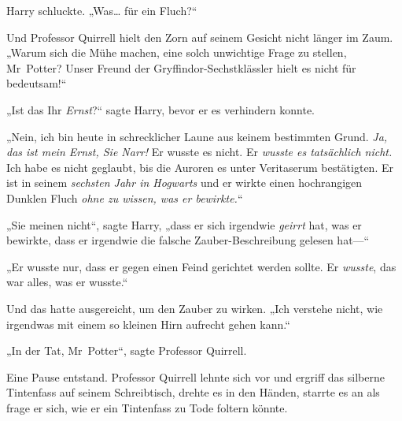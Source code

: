 Harry schluckte. „Was… für ein Fluch?“

Und Professor Quirrell hielt den Zorn auf seinem Gesicht nicht länger im Zaum. „Warum sich die Mühe machen, eine solch unwichtige Frage zu stellen, Mr~Potter? Unser Freund der Gryffindor-Sechstklässler hielt es nicht für bedeutsam!“

„Ist das Ihr \emph{Ernst}?“ sagte Harry, bevor er es verhindern konnte.

„Nein, ich bin heute in schrecklicher Laune aus keinem bestimmten Grund. \emph{Ja, das ist mein Ernst, Sie Narr!} Er wusste es nicht. Er \emph{wusste es tatsächlich nicht.} Ich habe es nicht geglaubt, bis die Auroren es unter Veritaserum bestätigten. Er ist in seinem \emph{sechsten Jahr in Hogwarts} und er wirkte einen hochrangigen Dunklen Fluch \emph{ohne zu wissen, was er bewirkte.}“

„Sie meinen nicht“, sagte Harry, „dass er sich irgendwie \emph{geirrt} hat, was er bewirkte, dass er irgendwie die falsche Zauber-Beschreibung gelesen hat—“

„Er wusste nur, dass er gegen einen Feind gerichtet werden sollte. Er \emph{wusste}, das war alles, was er wusste.“

Und das hatte ausgereicht, um den Zauber zu wirken. „Ich verstehe nicht, wie irgendwas mit einem so kleinen Hirn aufrecht gehen kann.“

„In der Tat, Mr~Potter“, sagte Professor Quirrell.

Eine Pause entstand. Professor Quirrell lehnte sich vor und ergriff das silberne Tintenfass auf seinem Schreibtisch, drehte es in den Händen, starrte es an als frage er sich, wie er ein Tintenfass zu Tode foltern könnte.

